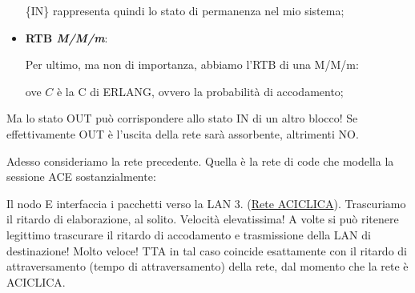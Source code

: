 \begin{itemize}
\{IN\} rappresenta quindi lo stato di permanenza nel mio sistema;

\item{\textbf{RTB \textit{M/M/m}}}:

Per ultimo, ma non di importanza, abbiamo l'RTB di una M/M/m:

\begin{center}
\end{center}

ove $C$ è la C di ERLANG, ovvero la probabilità di accodamento;

\end{itemize}

Ma lo stato OUT può corrispondere allo stato IN di un altro blocco! Se effettivamente OUT è l'uscita della rete sarà assorbente, altrimenti NO.

Adesso consideriamo la rete precedente. Quella è la rete di code che modella la sessione ACE sostanzialmente:

\begin{center}
\end{center}

Il nodo E interfaccia i pacchetti verso la LAN 3. (\underline{Rete ACICLICA}). Trascuriamo il ritardo di elaborazione, al solito. Velocità elevatissima! A volte si può ritenere legittimo trascurare il ritardo di accodamento e trasmissione della LAN di destinazione! Molto veloce! TTA in tal caso coincide esattamente con il ritardo di attraversamento (tempo di attraversamento) della rete, dal momento che la rete è ACICLICA.